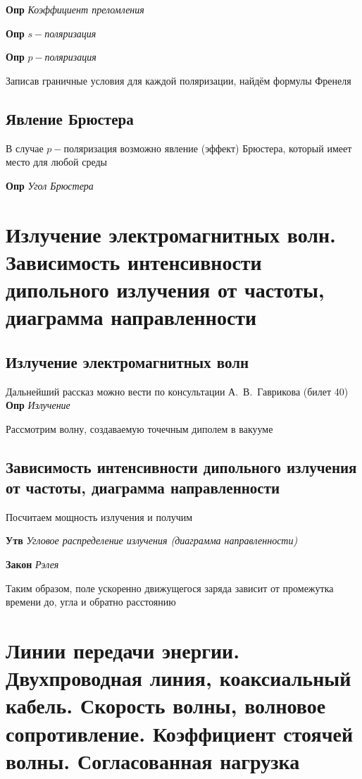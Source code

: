 \documentclass[a4paper, 14pt]{article}
\begin{document}
    \textbf{Опр} \textit{Коэффициент преломления}
    
    \textbf{Опр} \textit{$s-$поляризация}
    
    \textbf{Опр} \textit{$p-$поляризация}
    
    Записав граничные условия для каждой поляризации, найдём формулы Френеля
    
    \subsection{Явление Брюстера}
    
    В случае $p-$поляризация возможно явление (эффект) Брюстера, который имеет место для любой среды
    
    \textbf{Опр} \textit{Угол Брюстера}
    
    \section{Излучение электромагнитных волн.
    Зависимость интенсивности дипольного излучения от частоты, диаграмма направленности}
    
    \subsection{Излучение электромагнитных волн}
    
    Дальнейший рассказ можно вести по консультации А.~В.~Гаврикова (билет 40) \\
    
    \textbf{Опр} \textit{Излучение}
    
    Рассмотрим волну, создаваемую точечным диполем в вакууме
    
    \subsection{Зависимость интенсивности дипольного излучения от частоты, диаграмма направленности}
    
    Посчитаем мощность излучения и получим
    
    \textbf{Утв} \textit{Угловое распределение излучения (диаграмма направленности)}
    
    \textbf{Закон} \textit{Рэлея}
    
    Таким образом, поле ускоренно движущегося заряда зависит от промежутка времени до, угла и обратно расстоянию
    
    \section{Линии передачи энергии.
    Двухпроводная линия, коаксиальный кабель.
    Скорость волны, волновое сопротивление.
    Коэффициент стоячей волны.
    Согласованная нагрузка}
    
\end{document}
